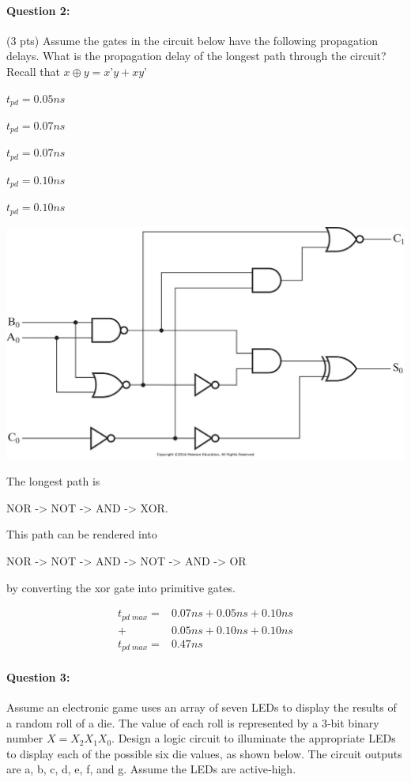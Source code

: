 \documentclass[12pt,letterpaper,titlepage]{report}
\begin{document}
\begin{raggedright}
\paragraph{Question 2:}
(3 pts) Assume the gates in the circuit below have the following propagation delays. What is the propagation delay of the longest path through the circuit? Recall that $x \oplus y = x’y + xy’$
\begin{description}[noitemsep]
\item[Inverter] $t_{pd} = 0.05 ns$
\item[NAND gate] $t_{pd} = 0.07 ns$
\item[NOR gate] $t_{pd} = 0.07 ns$
\item[AND gate] $t_{pd} = 0.10 ns$
\item[OR gate] $t_{pd} = 0.10 ns$
\end{description}
\begin{center}
\includegraphics[width=0.8\columnwidth]{hw5p2}
\end{center}
The longest path is 

NOR -> NOT -> AND -> XOR. 

This path can be rendered into 

NOR -> NOT -> AND -> NOT -> AND -> OR 

by converting the xor gate into primitive gates.

\begin{align*}
t_{pd\; max} =& 0.07ns + 0.05ns + 0.10ns 
		   \\+& 0.05ns + 0.10ns + 0.10ns
		   \\
t_{pd\; max} =& 0.47ns
\end{align*}
\pagebreak

\paragraph{Question 3:}
Assume an electronic game uses an array of seven LEDs to display the results of a random roll of a die.  The value of each roll is represented by a 3‐bit binary number $X = X_2 X_1 X_0$.  Design a logic circuit to illuminate the appropriate LEDs to display each of the possible six die values, as shown below. The circuit outputs are a, b, c, d, e, f, and g. Assume the LEDs are active‐high. 


\end{raggedright}
\end{document}
